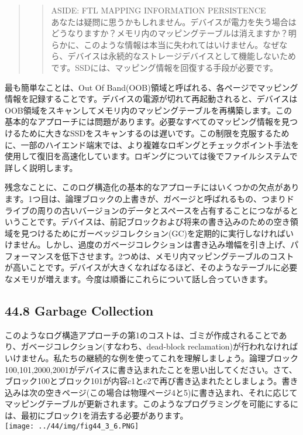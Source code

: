 \begin{quote}
\begin{quote}
ASIDE: FTL MAPPING INFORMATION PERSISTENCE\\
あなたは疑問に思うかもしれません。デバイスが電力を失う場合はどうなりますか？メモリ内のマッピングテーブルは消えますか？明らかに、このような情報は本当に失われてはいけません。なぜなら、デバイスは永続的なストレージデバイスとして機能しないためです。SSDには、マッピング情報を回復する手段が必要です。
\end{quote}
\end{quote}

最も簡単なことは、Out Of
Band(OOB)領域と呼ばれる、各ページでマッピング情報を記録することです。デバイスの電源が切れて再起動されると、デバイスはOOB領域をスキャンしてメモリ内のマッピングテーブルを再構築します。この基本的なアプローチには問題があります。必要なすべてのマッピング情報を見つけるために大きなSSDをスキャンするのは遅いです。この制限を克服するために、一部のハイエンド端末では、より複雑なロギングとチェックポイント手法を使用して復旧を高速化しています。ロギングについては後でファイルシステムで詳しく説明します。

残念なことに、このログ構造化の基本的なアプローチにはいくつかの欠点があります。1つ目は、論理ブロックの上書きが、ガベージと呼ばれるもの、つまりドライブの周りの古いバージョンのデータとスペースを占有することにつながるということです。デバイスは、前記ブロックおよび将来の書き込みのための空き領域を見つけるためにガーベッジコレクション(GC)を定期的に実行しなければいけません。しかし、過度のガベージコレクションは書き込み増幅を引き上げ、パフォーマンスを低下させます。2つめは、メモリ内マッピングテーブルのコストが高いことです。デバイスが大きくなればなるほど、そのようなテーブルに必要なメモリが増えます。今度は順番にこれらについて話し合っていきます。

\hypertarget{garbage-collection}{%
\subsection*{44.8 Garbage Collection}\label{garbage-collection}}

このようなログ構造アプローチの第1のコストは、ゴミが作成されることであり、ガベージコレクション(すなわち、dead-block
reclamation)が行われなければいけません。私たちの継続的な例を使ってこれを理解しましょう。論理ブロック100,101,2000,2001がデバイスに書き込まれたことを思い出してください。さて、ブロック100とブロック101が内容c1とc2で再び書き込まれたとしましょう。書き込みは次の空きページ(この場合は物理ページ4と5)に書き込まれ、それに応じてマッピングテーブルが更新されます。このようなプログラミングを可能にするには、最初にブロック1を消去する必要があります。\\
\texttt{[image: ../44/img/fig44\_3\_6.PNG]}

